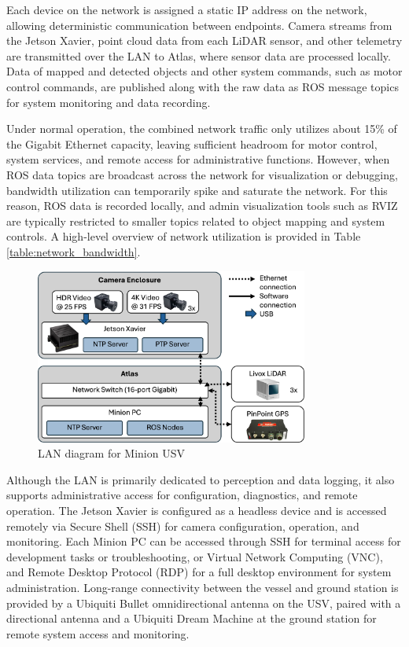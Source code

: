 \documentclass{erauthesis}
\begin{document}
Each device on the network is assigned a static IP address on the network, allowing deterministic communication between endpoints.
Camera streams from the Jetson Xavier, point cloud data from each LiDAR sensor, and other telemetry are transmitted over the LAN to Atlas, where sensor data are processed locally.
Data of mapped and detected objects and other system commands, such as motor control commands, are published along with the raw data as \ac{ROS} message topics for system monitoring and data recording.

Under normal operation, the combined network traffic only utilizes about 15\% of the Gigabit Ethernet capacity, 
leaving sufficient headroom for motor control, system services, and remote access for administrative functions.
However, when \ac{ROS} data topics are broadcast across the network for visualization or debugging, bandwidth utilization can temporarily spike and saturate the network.
For this reason, ROS data is recorded locally, and admin visualization tools such as RVIZ are typically restricted to smaller topics related to object mapping and system controls.
A high-level overview of network utilization is provided in Table \ref{table:network_bandwidth}.

\begin{figure}[htbp]
\centering
\includegraphics[width=0.8\textwidth]{Images/network_diagram2.png}
\caption{LAN diagram for Minion USV}
\label{fig:network_diagram}
\end{figure}

Although the LAN is primarily dedicated to perception and data logging, it also supports administrative access for configuration, diagnostics, and remote operation.
The Jetson Xavier is configured as a headless device and is accessed remotely via Secure Shell (SSH) for camera configuration, operation, and monitoring.
Each Minion PC can be accessed through SSH for terminal access for development tasks or troubleshooting, or Virtual Network Computing (VNC), and Remote Desktop Protocol (RDP) for a full desktop environment for system administration.
Long-range connectivity between the vessel and ground station is provided by a Ubiquiti Bullet omnidirectional antenna on the \ac{USV}, paired with a directional antenna and a Ubiquiti Dream Machine at the ground station for remote system access and monitoring.
\end{document}
